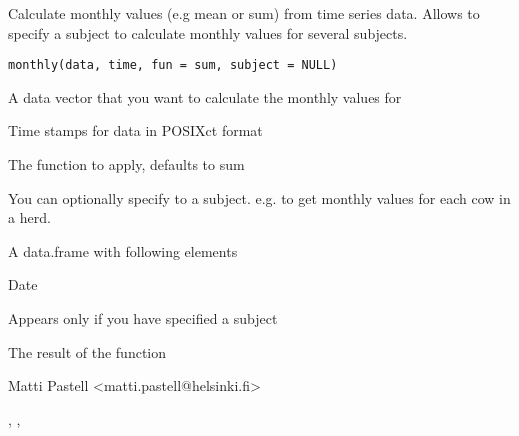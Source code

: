 \begin{Description}\relax
Calculate monthly values (e.g mean or sum) from time series data. Allows
to specify a subject to calculate monthly values for several subjects.
\end{Description}
\begin{Usage}
\begin{verbatim}
monthly(data, time, fun = sum, subject = NULL)
\end{verbatim}
\end{Usage}
\begin{Arguments}
\begin{ldescription}
\item[\code{data}] A data vector that you want to calculate the monthly values
for
\item[\code{time}] Time stamps for data in POSIXct format
\item[\code{fun}] The function to apply, defaults to sum
\item[\code{subject}] You can optionally specify to a subject. e.g. to get
monthly values for each cow in a herd.
\end{ldescription}
\end{Arguments}
\begin{Value}
A data.frame with following elements
\begin{ldescription}
\item[\code{Day}] Date
\item[\code{Subject}] Appears only if you have specified a subject
\item[\code{Result}] The result of the function
\end{ldescription}
\end{Value}
\begin{Author}\relax
Matti Pastell <matti.pastell@helsinki.fi>
\end{Author}
\begin{SeeAlso}\relax
{}, ,
\end{SeeAlso}
\begin{Examples}
\end{Examples}

